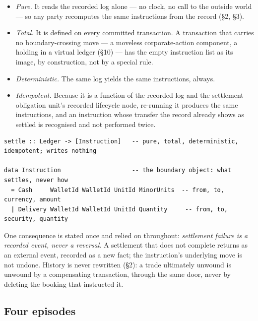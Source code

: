 \begin{itemize}[nosep]
\item \emph{Pure.} It reads the recorded log alone --- no clock, no call to the
outside world --- so any party recomputes the same instructions from the record
(\S2, \S3).
\item \emph{Total.} It is defined on every committed transaction. A transaction
that carries no boundary-crossing move --- a moveless corporate-action component, a
holding in a virtual ledger (\S10) --- has the empty instruction list as its image,
by construction, not by a special rule.
\item \emph{Deterministic.} The same log yields the same instructions, always.
\item \emph{Idempotent.} Because it is a function of the recorded log and the
settlement-obligation unit's recorded lifecycle node, re-running it produces the same
instructions, and an instruction whose transfer the record already shows as settled is
recognised and not performed twice.
\end{itemize}

\begin{lstlisting}
settle :: Ledger -> [Instruction]   -- pure, total, deterministic, idempotent; writes nothing

data Instruction                    -- the boundary object: what settles, never how
  = Cash     WalletId WalletId UnitId MinorUnits  -- from, to, currency, amount
  | Delivery WalletId WalletId UnitId Quantity     -- from, to, security, quantity
\end{lstlisting}

One consequence is stated once and relied on throughout: \emph{settlement failure
is a recorded event, never a reversal}. A settlement that does not complete returns
as an external event, recorded as a new fact; the instruction's underlying move is
not undone. History is never rewritten (\S2): a trade ultimately unwound is unwound
by a compensating transaction, through the same door, never by deleting the booking
that instructed it.

\subsection{Four episodes}

